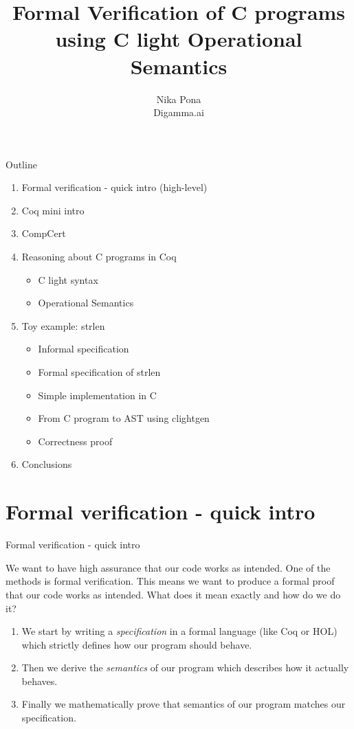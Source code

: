 \documentclass{beamer}
\title{Formal Verification of C programs using C light Operational Semantics}
\author{Nika Pona \\
  Digamma.ai}
\begin{document}
\maketitle

\begin{frame}{Outline}
\begin{enumerate}
\item Formal verification - quick intro (high-level)
\item Coq mini intro 
\item CompCert

\item Reasoning about C programs in Coq
  \begin{itemize}
    \item C light syntax
   \item Operational Semantics
\end{itemize}
\item Toy example: strlen 
\begin{itemize}
\item Informal specification 
\item Formal specification of strlen 
\item Simple implementation in C
\item From C program to AST using clightgen
\item Correctness proof
\end{itemize}
\item Conclusions
\end{enumerate} 
\end{frame}

\section{Formal verification - quick intro}
\begin{frame}{Formal verification - quick intro}
 
  We want to have high assurance that our code works as intended. One of the methods is formal verification. This means we want to produce a formal proof that our code works as intended. What does it mean exactly and how do we do it?
  
  \begin{enumerate}
  \item We start by writing a \emph{specification} in a formal language (like Coq or HOL) which strictly defines how our program should behave.
  \item Then we derive the \emph{semantics} of our program which describes how it actually behaves. 
  \item Finally we mathematically prove that semantics of our program matches our specification.
\end{enumerate}
  
\end{frame}
\end{document}
